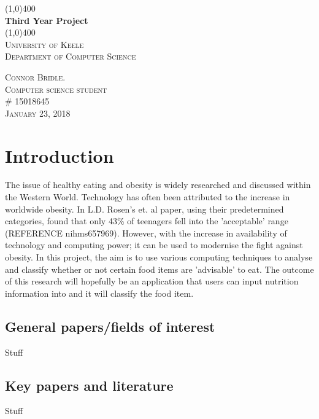 \documentclass[11pt]{article}
\begin{document}
\begin{titlepage}
	\begin{center}
	\line(1,0){400} \\
	[0.25in]
	\huge{\bfseries Third Year Project} \\
	[2mm]
	\line(1,0){400} \\
	[1.5cm]
	\textsc{\LARGE University of Keele}\\
	\textsc{\Large Department of Computer Science}\\
	[10cm]
	\end{center}
	\begin{flushright}
	\textsc{\large Connor Bridle. \\
	Computer science student\\
	\# 15018645 \\
	January 23, 2018 \\}
	\end{flushright}
\end{titlepage}
\tableofcontents 
\pagebreak
\section{Introduction}
The issue of healthy eating and obesity is widely researched and discussed within the Western World. Technology has often been attributed to the increase in worldwide obesity. In L.D. Rosen's et. al paper, using their predetermined categories, found that only 43\% of teenagers fell into the 'acceptable' range (REFERENCE nihms657969). However, with the increase in availability of technology and computing power; it can be used to modernise the fight against obesity. In this project, the aim is to use various computing techniques to analyse and classify whether or not certain food items are 'advisable' to eat. The outcome of this research will hopefully be an application that users can input nutrition information into and it will classify the food item.
	\subsection{General papers/fields of interest}
	Stuff
	\subsection{Key papers and literature}
	Stuff
\end{document}
